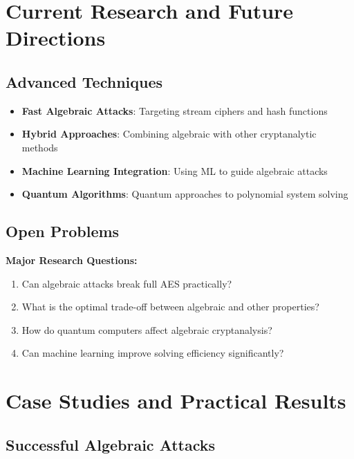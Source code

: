 \documentclass[12pt,a4paper]{article}
\begin{document}
\section{Current Research and Future Directions}

\subsection{Advanced Techniques}

\begin{itemize}
    \item \textbf{Fast Algebraic Attacks}: Targeting stream ciphers and hash functions
    \item \textbf{Hybrid Approaches}: Combining algebraic with other cryptanalytic methods
    \item \textbf{Machine Learning Integration}: Using ML to guide algebraic attacks
    \item \textbf{Quantum Algorithms}: Quantum approaches to polynomial system solving
\end{itemize}

\subsection{Open Problems}

\begin{mathematicsbox}
\textbf{Major Research Questions:}
\begin{enumerate}
    \item Can algebraic attacks break full AES practically?
    \item What is the optimal trade-off between algebraic and other properties?
    \item How do quantum computers affect algebraic cryptanalysis?
    \item Can machine learning improve solving efficiency significantly?
\end{enumerate}
\end{mathematicsbox}

\section{Case Studies and Practical Results}

\subsection{Successful Algebraic Attacks}
\end{document}
